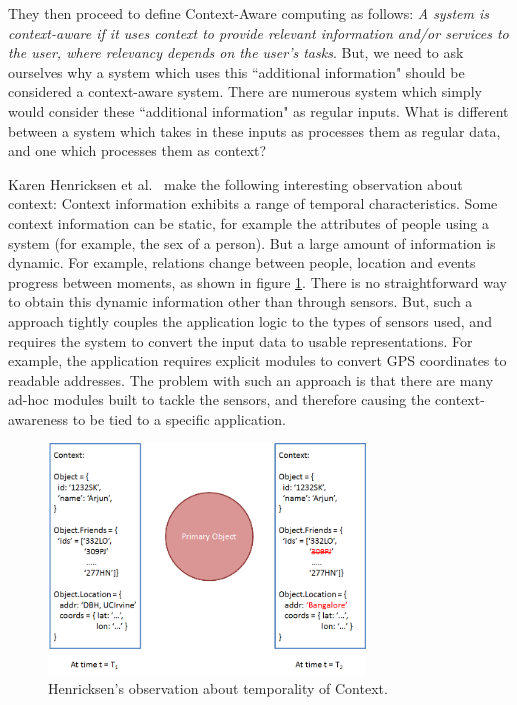 They then proceed to define Context-Aware computing as follows: \textit{A system is context-aware if it uses context to provide relevant information and/or services to the user, where relevancy depends on the user's tasks}. But, we need to ask ourselves why a system which uses this ``additional information" should be considered a context-aware system. There are numerous system which simply would consider these ``additional information" as regular inputs. What is different between a system which takes in these inputs as processes them as regular data, and one which processes them as context?

Karen Henricksen et al.\ \cite{henricksen2002modeling} make the following interesting observation about context: Context information exhibits a range of temporal characteristics. Some context information can be static, for example the attributes of people using a system (for example, the sex of a person). But a large amount of information is dynamic. For example, relations change between people, location and events progress between moments, as shown in figure \ref{fig:karen-obs}. There is no straightforward way to obtain this dynamic information other than through sensors. But, such a approach tightly couples the application logic to the types of sensors used, and requires the system to convert the input data to usable representations. For example, the application requires explicit modules to convert GPS coordinates to readable addresses. The problem with such an approach is that there are many ad-hoc modules built to tackle the sensors, and therefore causing the context-awareness to be tied to a specific application.

\begin{figure}[t]
\centering
\includegraphics[width=0.75\textwidth]{media/chapter2/ka-obs.png}
\caption{Henricksen's observation about temporality of Context.}
\label{fig:karen-obs}
\end{figure}

